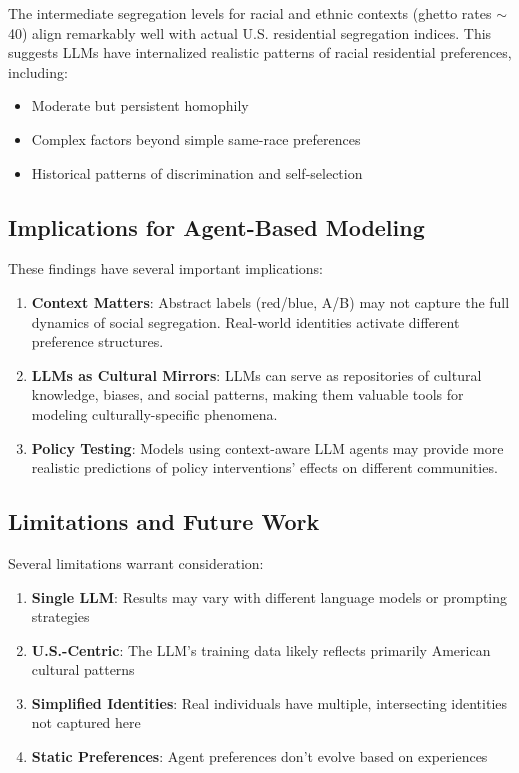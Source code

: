 \documentclass[pdflatex,sn-basic]{sn-jnl}%
\providecommand{\tightlist}{%
  \setlength{\itemsep}{0pt}\setlength{\parskip}{0pt}}
\begin{document}
The intermediate segregation levels for racial and ethnic contexts
(ghetto rates $\sim$40) align remarkably well with actual U.S.
residential segregation indices. This suggests LLMs have internalized
realistic patterns of racial residential preferences, including: 
\begin{itemize}
\item Moderate but persistent homophily 
\item Complex factors beyond simple
same-race preferences 
\item Historical patterns of discrimination and
self-selection
\end{itemize}

\subsection{Implications for Agent-Based
Modeling}\label{implications-for-agent-based-modeling}

These findings have several important implications:

\begin{enumerate}
\item
  \textbf{Context Matters}: Abstract labels (red/blue, A/B) may not
  capture the full dynamics of social segregation. Real-world identities
  activate different preference structures.
\item
  \textbf{LLMs as Cultural Mirrors}: LLMs can serve as repositories of
  cultural knowledge, biases, and social patterns, making them valuable
  tools for modeling culturally-specific phenomena.
\item
  \textbf{Policy Testing}: Models using context-aware LLM agents may
  provide more realistic predictions of policy interventions' effects on
  different communities.
\end{enumerate}

\subsection{Limitations and Future
Work}\label{limitations-and-future-work}

Several limitations warrant consideration:

\begin{enumerate}
\tightlist
\item
  \textbf{Single LLM}: Results may vary with different language models
  or prompting strategies
\item
  \textbf{U.S.-Centric}: The LLM's training data likely reflects
  primarily American cultural patterns
\item
  \textbf{Simplified Identities}: Real individuals have multiple,
  intersecting identities not captured here
\item
  \textbf{Static Preferences}: Agent preferences don't evolve based on
  experiences
\end{enumerate}
\end{document}
